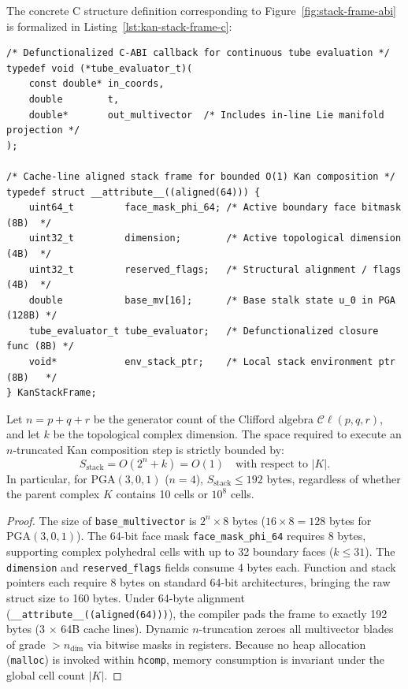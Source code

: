 \documentclass[acmsmall,screen,nonacm]{acmart}
\newcommand{\Cl}{\mathcal{C}\ell}
\newcommand{\PGA}{\mathrm{PGA}(3,0,1)}
\newcommand{\hcomp}{\texttt{hcomp}}
\begin{document}
The concrete C structure definition corresponding to Figure~\ref{fig:stack-frame-abi} is formalized in Listing~\ref{lst:kan-stack-frame-c}:

\begin{lstlisting}[style=ccode,caption={The 64-byte cache-aligned \texttt{KanStackFrame} C-ABI specification.},label={lst:kan-stack-frame-c}]
/* Defunctionalized C-ABI callback for continuous tube evaluation */
typedef void (*tube_evaluator_t)(
    const double* in_coords,
    double        t,
    double*       out_multivector  /* Includes in-line Lie manifold projection */
);

/* Cache-line aligned stack frame for bounded O(1) Kan composition */
typedef struct __attribute__((aligned(64))) {
    uint64_t         face_mask_phi_64; /* Active boundary face bitmask (8B)  */
    uint32_t         dimension;        /* Active topological dimension (4B)  */
    uint32_t         reserved_flags;   /* Structural alignment / flags (4B)  */
    double           base_mv[16];      /* Base stalk state u_0 in PGA (128B) */
    tube_evaluator_t tube_evaluator;   /* Defunctionalized closure func (8B) */
    void*            env_stack_ptr;    /* Local stack environment ptr (8B)   */
} KanStackFrame;
\end{lstlisting}

\begin{theorem}
Let $n = p+q+r$ be the generator count of the Clifford algebra $\Cl(p,q,r)$, and let $k$ be the topological complex dimension. The space required to execute an $n$-truncated Kan composition step is strictly bounded by:
\[
  S_{\mathrm{stack}} = O(2^n + k) = O(1) \quad \text{with respect to } |K|.
\]
In particular, for $\PGA$ ($n=4$), $S_{\mathrm{stack}} \leq 192$ bytes, regardless of whether the parent complex $K$ contains 10 cells or $10^8$ cells.
\end{theorem}

\begin{proof}
The size of \texttt{base\_multivector} is $2^n \times 8$ bytes ($16 \times 8 = 128$ bytes for $\PGA$). The 64-bit face mask \texttt{face\_mask\_phi\_64} requires 8 bytes, supporting complex polyhedral cells with up to 32 boundary faces ($k \le 31$). The \texttt{dimension} and \texttt{reserved\_flags} fields consume 4 bytes each. Function and stack pointers each require 8 bytes on standard 64-bit architectures, bringing the raw struct size to 160 bytes. Under 64-byte alignment (\texttt{\_\_attribute\_\_((aligned(64)))}), the compiler pads the frame to exactly 192 bytes (3 $\times$ 64B cache lines). Dynamic $n$-truncation zeroes all multivector blades of grade $> n_\mathrm{dim}$ via bitwise masks in registers. Because no heap allocation (\texttt{malloc}) is invoked within \hcomp, memory consumption is invariant under the global cell count $|K|$.
\end{proof}
\end{document}
